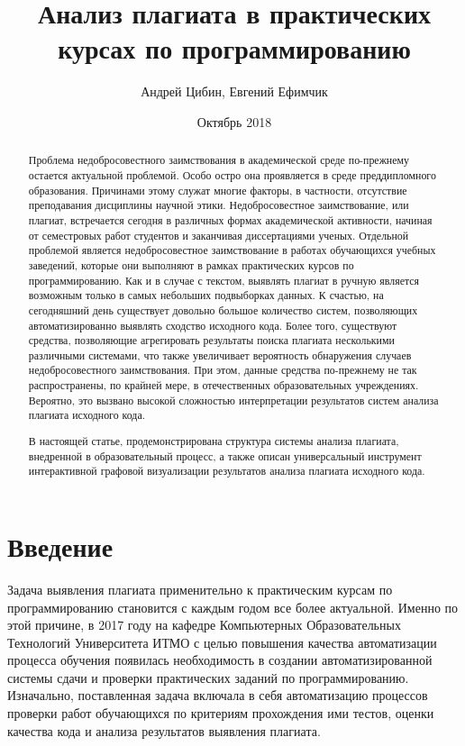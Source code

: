 \documentclass[a4paper,14pt]{extarticle}
\title{Анализ плагиата в практических курсах по программированию}
\author{Андрей Цибин, Евгений Ефимчик}
\date{Октябрь 2018}
\begin{document}
\maketitle

\begin{abstract}

Проблема недобросовестного заимствования в академической среде по-преж\-нему остается актуальной проблемой. Особо остро она проявляется в среде преддипломного образования. Причинами этому служат многие факторы, в частности, отсутствие преподавания дисциплины научной этики. Недобросовестное заимствование, или плагиат, встречается сегодня в различных формах академической активности, начиная от семестровых работ студентов и заканчивая диссертациями ученых. Отдельной проблемой является недобросовестное заимствование в работах обучающихся учебных заведений, которые они выполняют в рамках практических курсов по программированию. Как и в случае с текстом, выявлять плагиат в ручную является возможным только в самых небольших подвыборках данных. К счастью, на сегодняшний день существует довольно большое количество систем, позволяющих автоматизированно выявлять сходство исходного кода. Более того, существуют средства, позволяющие агрегировать результаты поиска плагиата несколькими различными системами, что также увеличивает вероятность обнаружения случаев недобросовестного заимствования. При этом, данные средства по-прежнему не так распространены, по крайней мере, в отечественных образовательных учреждениях. Вероятно, это вызвано высокой сложностью интерпретации результатов систем анализа плагиата исходного кода.

В настоящей статье, продемонстрирована структура системы анализа плагиата, внедренной в образовательный процесс, а также описан универсальный инструмент интерактивной графовой визуализации результатов анализа плагиата исходного кода.

\end{abstract}

\section{Введение}

Задача выявления плагиата применительно к практическим курсам по программированию становится с каждым годом все более актуальной. Именно по этой причине, в 2017 году на кафедре Компьютерных Образовательных Технологий Университета ИТМО с целью повышения качества автоматизации процесса обучения появилась необходимость в создании автоматизированной системы сдачи и проверки практических заданий по программированию. Изначально, поставленная задача включала в себя автоматизацию процессов проверки работ обучающихся по критериям прохождения ими тестов, оценки качества кода и анализа результатов выявления плагиата.
\end{document}
